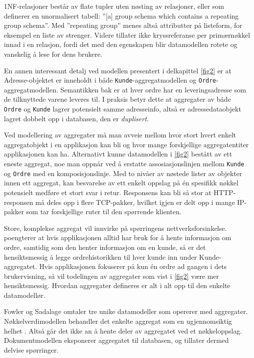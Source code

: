 1NF-relasjoner består av flate tupler uten nøsting av relasjoner, eller som \cite{codd1971} definerer en unormalisert tabell: ''[a] group schema which contains a repeating group schema''. Med ''repeating group'' menes altså attributter på listeform, for eksempel en liste av strenger. Videre tillater ikke \cite{codd1971} kryssreferanse per primærnøkkel innad i en relasjon, fordi det med den egenskapen blir datamodellen rotete og vanskelig å lese for dens brukere.

En annen interessant detalj ved modellen presentert i delkapittel \ref{fig2} er at Adresse-objektet er inneholdt i både \texttt{Kunde}-aggregatmodellen og \texttt{Ordre}-aggregatmodellen. Semantikken bak er at hver ordre har en leveringsadresse som de tilknyttede varene leveres til. I praksis betyr dette at aggregater av både \texttt{Ordre} og \texttt{Kunde} lagrer potensielt samme adresseinfo, altså er adressedataobjekt lagret dobbelt opp i databasen, den er \emph{duplisert}.

Ved modellering av aggregater må man avveie mellom hvor stort hvert enkelt aggregatobjekt i en applikasjon kan bli og hvor mange forskjellige aggregatentiter applikasjonen kan ha. Alternativt kunne datamodellen i \ref{fig2} bestått av ett eneste aggregat, noe man oppnår ved å erstatte assosiasjonslinjen mellom \texttt{Kunde} og \texttt{Ordre} med en komposisjonslinje. Med to nivåer av nøstede lister av objekter innen ett aggregat, kan besvarelse av ett enkelt oppslag på én spesifikk nøkkel potensielt medføre et stort svar i retur. Responsens kan bli så stor at HTTP-responsen må deles opp i flere TCP-pakker, hvilket igjen er delt opp i mange IP-pakker som tar forskjellige ruter til den spørrende klienten.

Store, komplekse aggregat vil innvirke på spørringens nettverksforsinkelse. \cite{sadalage2013} poengterer at hvis applikasjonen alltid har bruk for å hente informasjon om ordre, samtidig som den henter informasjon om en kunde, så er det hensiktsmessig å legge ordrehistorikken til hver kunde inn under Kunde-aggregatet. Hvis applikasjonen fokuserer på kun én ordre ad gangen i dets brukervisning, så vil todelingen av aggregater som vist i \ref{fig2} være mer hensiktsmessig. Hvordan aggregater defineres er alt i alt opp til den enkelte datamodellør.

Fowler og Sadalage omtaler tre unike datamodeller som opererer med aggregater. Nøkkel\-verdi\-modellen behandler det enkelte aggregat som en ugjennomsiktig helhet \citep{sadalage2013}. Altså går det ikke an å hente deler av aggregatet ved et nøkkeloppslag. Dokumentmodellen eksponerer aggregatet til databasen, og tillater dermed delvise spørringer.

